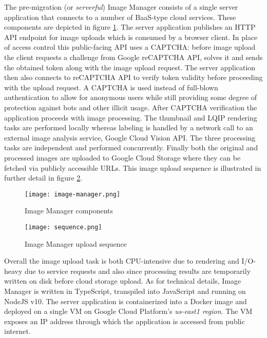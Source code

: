 The pre-migration (or \textit{serverful}) Image Manager consists of a single server application that connects to a number of BaaS-type cloud services. These components are depicted in figure \ref{fig:serverfulArchitecture}. The server application publishes an HTTP API endpoint for image uploads which is consumed by a browser client. In place of access control this public-facing API uses a CAPTCHA: before image upload the client requests a challenge from Google reCAPTCHA API, solves it and sends the obtained token along with the image upload request. The server application then also connects to reCAPTCHA API to verify token validity before proceeding with the upload request. A CAPTCHA is used instead of full-blown authentication to allow for anonymous users while still providing some degree of protection against bots and other illicit usage. After CAPTCHA verification the application proceeds with image processing. The thumbnail and LQIP rendering tasks are performed locally whereas labeling is handled by a network call to an external image analysis service, Google Cloud Vision API. The three processing tasks are independent and performed concurrently. Finally both the original and processed images are uploaded to Google Cloud Storage where they can be fetched via publicly accessible URLs. This image upload sequence is illustrated in further detail in figure \ref{fig:serverfulSequence}.

\begin{figure}[H]
  \centering
  \texttt{[image: image-manager.png]}
  \caption{Image Manager components}
  \label{fig:serverfulArchitecture}
\end{figure}

\begin{figure}[H]
  \centering
  \texttt{[image: sequence.png]}
  \caption{Image Manager upload sequence}
  \label{fig:serverfulSequence}
\end{figure}

Overall the image upload task is both CPU-intensive due to rendering and I/O-heavy due to service requests and also since processing results are temporarily written on disk before cloud storage upload. As for technical details, Image Manager is written in TypeScript, transpiled into JavaScript and running on NodeJS v10. The server application is containerized into a Docker image and deployed on a single VM on Google Cloud Platform's \textit{us-east1 region}. The VM exposes an IP address through which the application is accessed from public internet.

